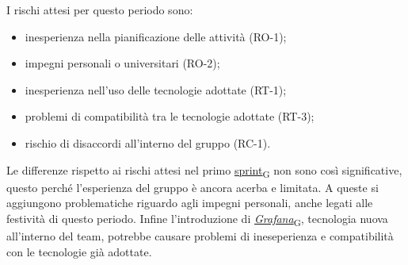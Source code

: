 I rischi attesi per questo periodo sono:
\begin{itemize}
	\item inesperienza nella pianificazione delle attività (RO-1);
	\item impegni personali o universitari (RO-2);
	\item inesperienza nell'uso delle tecnologie adottate (RT-1);
	\item problemi di compatibilità tra le tecnologie adottate (RT-3);
	\item rischio di disaccordi all'interno del gruppo (RC-1).
\end{itemize}
Le differenze rispetto ai rischi attesi nel primo \href{https://7last.github.io/docs/rtb/documentazione-interna/glossario\#sprint}{sprint\textsubscript{G}} non sono così significative, questo perché l'esperienza del gruppo è ancora acerba e limitata.
A queste si aggiungono problematiche riguardo agli impegni personali, anche legati alle festività di questo periodo. Infine l'introduzione di \href{https://7last.github.io/docs/rtb/documentazione-interna/glossario\#grafana}{\textit{Grafana}\textsubscript{G}},
tecnologia nuova all'interno del team, potrebbe causare problemi di ineseperienza e compatibilità con le tecnologie già adottate.

